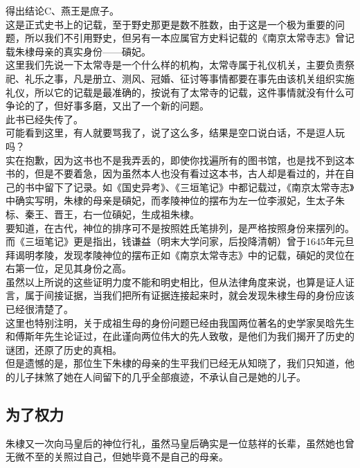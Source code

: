 \begin{multicols}{\theparacolNo}
得出结论C、燕王是庶子。\\

这是正式史书上的记载，至于野史那更是数不胜数，由于这是一个极为重要的问题，所以我们不引用野史，但另有一本应属官方史料记载的《南京太常寺志》曾记载朱棣母亲的真实身份——碽妃。\\

这里我们先说一下太常寺是一个什么样的机构，太常寺属于礼仪机关，主要负责祭祀、礼乐之事，凡是册立、测风、冠婚、征讨等事情都要在事先由该机关组织实施礼仪，所以它的记载是最准确的，按说有了太常寺的记载，这件事情就没有什么可争论的了，但好事多磨，又出了一个新的问题。\\

此书已经失传了。\\

可能看到这里，有人就要骂我了，说了这么多，结果是空口说白话，不是逗人玩吗？\\

实在抱歉，因为这书也不是我弄丢的，即使你找遍所有的图书馆，也是找不到这本书的，但是不要着急，因为虽然本人也没有看过这本书，古人却是看过的，并在自己的书中留下了记录。如《国史异考》、《三垣笔记》中都记载过，《南京太常寺志》中确实写明，朱棣的母亲是碽妃，而孝陵神位的摆布为左一位李淑妃，生太子朱标、秦王、晋王，右一位碽妃，生成祖朱棣。\\

要知道，在古代，神位的排序可不是按照姓氏笔排列，是严格按照身份来摆列的。\\

而《三垣笔记》更是指出，钱谦益（明末大学问家，后投降清朝）曾于1645年元旦拜谒明孝陵，发现孝陵神位的摆布正如《南京太常寺志》中的记载，碽妃的灵位在右第一位，足见其身份之高。\\

虽然以上所说的这些证明力度不能和明史相比，但从法律角度来说，也算是证人证言，属于间接证据，当我们把所有证据连接起来时，就会发现朱棣生母的身份应该已经很清楚了。\\

这里也特别注明，关于成祖生母的身份问题已经由我国两位著名的史学家吴晗先生和傅斯年先生论证过，在此谨向两位伟大的先人致敬，是他们为我们揭开了历史的谜团，还原了历史的真相。\\

但是遗憾的是，那位生下朱棣的母亲的生平我们已经无从知晓了，我们只知道，他的儿子抹煞了她在人间留下的几乎全部痕迹，不承认自己是她的儿子。\\

\subsection{为了权力}
朱棣又一次向马皇后的神位行礼，虽然马皇后确实是一位慈祥的长辈，虽然她也曾无微不至的关照过自己，但她毕竟不是自己的母亲。\\


\end{multicols}
